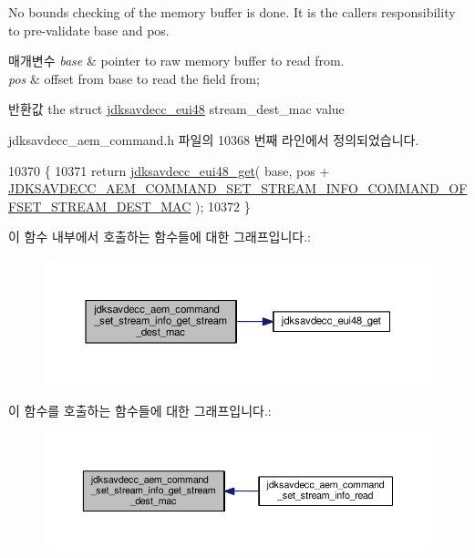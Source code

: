 No bounds checking of the memory buffer is done. It is the caller\textquotesingle{}s responsibility to pre-\/validate base and pos.


\begin{DoxyParams}{매개변수}
{\em base} & pointer to raw memory buffer to read from. \\
\hline
{\em pos} & offset from base to read the field from; \\
\hline
\end{DoxyParams}
\begin{DoxyReturn}{반환값}
the struct \hyperlink{structjdksavdecc__eui48}{jdksavdecc\+\_\+eui48} stream\+\_\+dest\+\_\+mac value 
\end{DoxyReturn}


jdksavdecc\+\_\+aem\+\_\+command.\+h 파일의 10368 번째 라인에서 정의되었습니다.


\begin{DoxyCode}
10370 \{
10371     \textcolor{keywordflow}{return} \hyperlink{group__eui48_ga7b4c95f03a90bdf416e9d0833ac08a86}{jdksavdecc\_eui48\_get}( base, pos + 
      \hyperlink{group__command__set__stream__info_gaa166b601dec75ed9ef1deae81c019016}{JDKSAVDECC\_AEM\_COMMAND\_SET\_STREAM\_INFO\_COMMAND\_OFFSET\_STREAM\_DEST\_MAC}
       );
10372 \}
\end{DoxyCode}


이 함수 내부에서 호출하는 함수들에 대한 그래프입니다.\+:
\nopagebreak
\begin{figure}[H]
\begin{center}
\leavevmode
\includegraphics[width=350pt]{group__command__set__stream__info_gaaa0c183cf50d8b2f3f785a61cd45180c_cgraph}
\end{center}
\end{figure}




이 함수를 호출하는 함수들에 대한 그래프입니다.\+:
\nopagebreak
\begin{figure}[H]
\begin{center}
\leavevmode
\includegraphics[width=350pt]{group__command__set__stream__info_gaaa0c183cf50d8b2f3f785a61cd45180c_icgraph}
\end{center}
\end{figure}


